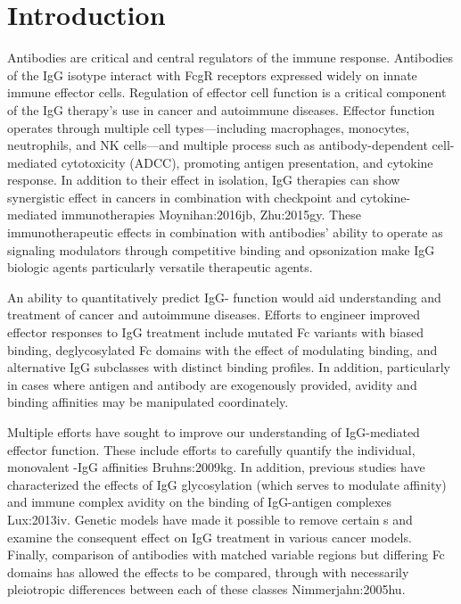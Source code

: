 \section{Introduction}

Antibodies are critical and central regulators of the immune response. Antibodies of the IgG isotype interact with FcgR receptors expressed widely on innate immune effector cells. Regulation of effector cell function is a critical component of the IgG therapy's use in cancer and autoimmune diseases. Effector function operates through multiple cell types---including macrophages, monocytes, neutrophils, and NK cells---and multiple process such as antibody-dependent cell-mediated cytotoxicity (ADCC), promoting antigen presentation, and cytokine response. In addition to their effect in isolation, IgG therapies can show synergistic effect in cancers in combination with checkpoint and cytokine-mediated immunotherapies \ac{Moynihan:2016jb, Zhu:2015gy}. These immunotherapeutic effects in combination with antibodies' ability to operate as signaling modulators through competitive binding and opsonization make IgG biologic agents particularly versatile therapeutic agents.

An ability to quantitatively predict IgG-\fcgr{} function would aid understanding and treatment of cancer and autoimmune diseases. Efforts to engineer improved effector responses to IgG treatment include mutated Fc variants with biased \fcgr{} binding, deglycosylated Fc domains with the effect of modulating \fcgr{} binding, and alternative IgG subclasses with distinct binding profiles. In addition, particularly in cases where antigen and antibody are exogenously provided, avidity and binding affinities may be manipulated coordinately. %

Multiple efforts have sought to improve our understanding of IgG-mediated effector function. These include efforts to carefully quantify the individual, monovalent \fcgr{}-IgG affinities \ac{Bruhns:2009kg}. In addition, previous studies have characterized the effects of IgG glycosylation (which serves to modulate \fcgr{} affinity) and immune complex avidity on the binding of IgG-antigen complexes \ac{Lux:2013iv}. Genetic models have made it possible to remove certain \fcgr{}s and examine the consequent effect on IgG treatment in various cancer models\cite{Clynes:2000ga}. Finally, comparison of antibodies with matched variable regions but differing Fc domains has allowed the effects to be compared, through with necessarily pleiotropic differences between each of these classes \ac{Nimmerjahn:2005hu}.

